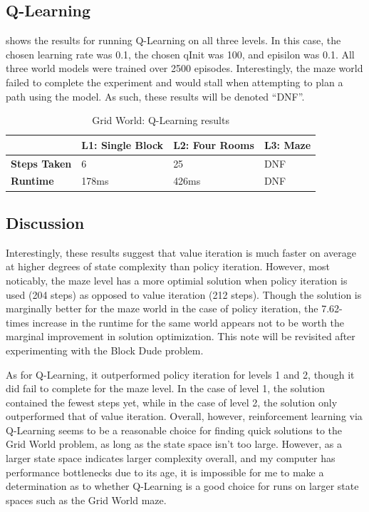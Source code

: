 \documentclass{article}
\begin{document}
    \subsection{Q-Learning}
       shows the results for running Q-Learning on all three levels. In this case, the chosen learning rate was 0.1, the chosen qInit was 100, and episilon was 0.1. All three world models were trained over 2500 episodes. Interestingly, the maze world failed to complete the experiment and would stall when attempting to plan a path using the model. As such, these results will be denoted ``DNF''.

      \begin{table}[h]
      \centering

        \begin{tabular}{|l|l|l|l|} \hline
          & \textbf{L1: Single Block} & \textbf{L2: Four Rooms} & \textbf{L3: Maze} \\ \hline
          \textbf{Steps Taken} & 6 & 25 & DNF \\ \hline
          \textbf{Runtime} & 178ms & 426ms & DNF \\ \hline
        \end{tabular}

      \caption{Grid World: Q-Learning results}
      \label{tab:gw-ql-results}
      \end{table}

    \subsection{Discussion}
      Interestingly, these results suggest that value iteration is much faster on average at higher degrees of state complexity than policy iteration. However, most noticably, the maze level has a more optimial solution when policy iteration is used (204 steps) as opposed to value iteration (212 steps). Though the solution is marginally better for the maze world in the case of policy iteration, the 7.62-times increase in the runtime for the same world appears not to be worth the marginal improvement in solution optimization. This note will be revisited after experimenting with the Block Dude problem.

      As for Q-Learning, it outperformed policy iteration for levels 1 and 2, though it did fail to complete for the maze level. In the case of level 1, the solution contained the fewest steps yet, while in the case of level 2, the solution only outperformed that of value iteration. Overall, however, reinforcement learning via Q-Learning seems to be a reasonable choice for finding quick solutions to the Grid World problem, as long as the state space isn't too large. However, as a larger state space indicates larger complexity overall, and my computer has performance bottlenecks due to its age, it is impossible for me to make a determination as to whether Q-Learning is a good choice for runs on larger state spaces such as the Grid World maze.
\end{document}
